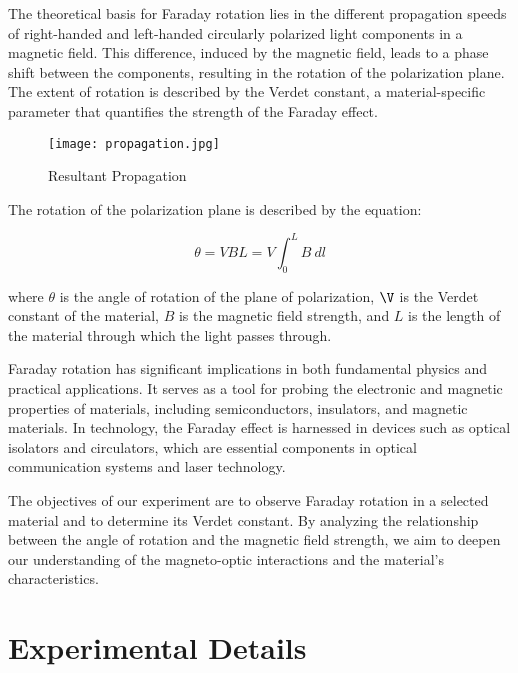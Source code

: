 \documentclass[11pt]{article}
\begin{document}
	The theoretical basis for Faraday rotation lies in the different propagation speeds of right-handed and left-handed circularly polarized light components in a magnetic field. This difference, induced by the magnetic field, leads to a phase shift between the components, resulting in the rotation of the polarization plane. The extent of rotation is described by the Verdet constant, a material-specific parameter that quantifies the strength of the Faraday effect.

	\begin{figure}[htbp]
		\centering
		\caption{Resultant Propagation}
		\texttt{[image: propagation.jpg]}
	\end{figure}

	The rotation of the polarization plane is described by the equation:

	\begin{equation}
		\theta = VBL = V \int_{0}^{L} B \ dl \label{eq:1}
	\end{equation}

	where \(\theta\) is the angle of rotation of the plane of polarization, \(\V\) is the Verdet constant of the material, \(B\) is the magnetic field strength, and \(L\) is the length of the material through which the light passes through.

	Faraday rotation has significant implications in both fundamental physics and practical applications. It serves as a tool for probing the electronic and magnetic properties of materials, including semiconductors, insulators, and magnetic materials. In technology, the Faraday effect is harnessed in devices such as optical isolators and circulators, which are essential components in optical communication systems and laser technology.

	The objectives of our experiment are to observe Faraday rotation in a selected material and to determine its Verdet constant. By analyzing the relationship between the angle of rotation and the magnetic field strength, we aim to deepen our understanding of the magneto-optic interactions and the material's characteristics.

\clearpage

	\section{Experimental Details}
\end{document}
